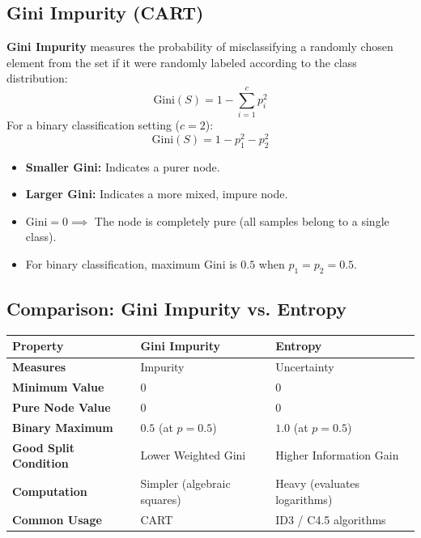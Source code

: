 \subsection{Gini Impurity (CART)}
\textbf{Gini Impurity} measures the probability of misclassifying a randomly chosen element from the set if it were randomly labeled according to the class distribution:
\begin{equation}
\text{Gini}(S) = 1 - \sum_{i=1}^{c} p_i^2
\end{equation}
For a binary classification setting ($c = 2$):
\begin{equation}
\text{Gini}(S) = 1 - p_1^2 - p_2^2
\end{equation}
\begin{itemize}
    \item \textbf{Smaller Gini:} Indicates a purer node.
    \item \textbf{Larger Gini:} Indicates a more mixed, impure node.
    \item $\text{Gini} = 0 \implies$ The node is completely pure (all samples belong to a single class).
    \item For binary classification, maximum Gini is $0.5$ when $p_1 = p_2 = 0.5$.
\end{itemize}

\subsection{Comparison: Gini Impurity vs. Entropy}

\begin{center}\renewcommand{\arraystretch}{1.35}
\begin{tabular}{lll}
\toprule
\textbf{Property} & \textbf{Gini Impurity} & \textbf{Entropy} \\
\midrule
\textbf{Measures} & Impurity & Uncertainty \\
\textbf{Minimum Value} & $0$ & $0$ \\
\textbf{Pure Node Value} & $0$ & $0$ \\
\textbf{Binary Maximum} & $0.5$ (at $p = 0.5$) & $1.0$ (at $p = 0.5$) \\
\textbf{Good Split Condition} & Lower Weighted Gini & Higher Information Gain \\
\textbf{Computation} & Simpler (algebraic squares) & Heavy (evaluates logarithms) \\
\textbf{Common Usage} & CART & ID3 / C4.5 algorithms \\
\bottomrule
\end{tabular}
\end{center}

